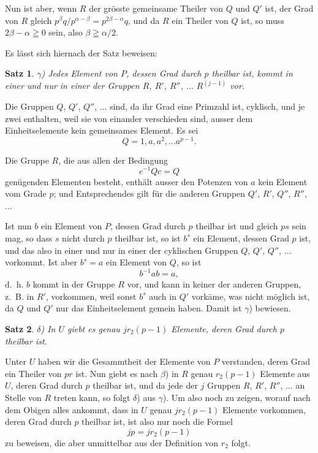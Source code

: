 \documentclass[12pt,a4paper]{article}
\theoremstyle{plain}
\newtheorem{satz}{Satz}[section]
\theoremstyle{definition}
\theoremstyle{remark}
\begin{document}
Nun ist aber, wenn $R$ der grösste gemeinsame Theiler von $Q$ und $Q'$ ist, der Grad von $R$ gleich $p^{\beta}q/p^{\alpha-\beta} = p^{2\beta-\alpha}q$, und da $R$ ein Theiler von $Q$ ist, so muss $2\beta - \alpha \geqq 0$ sein, also $\beta \geqq \alpha/2$.

Es lässt sich hiernach der Satz beweisen:

\begin{satz}
$\gamma$) Jedes Element von $P$, dessen Grad durch $p$ theilbar ist, kommt in einer und nur in einer der Gruppen $R$, $R'$, $R''$, $\ldots$ $R^{(j-1)}$ vor.
\end{satz}

Die Gruppen $Q$, $Q'$, $Q''$, $\ldots$ sind, da ihr Grad eine Primzahl ist, cyklisch, und je zwei enthalten, weil sie von einander verschieden sind, ausser dem Einheitselemente kein gemeinsames Element. Es sei
\[
Q = 1, a, a^{2}, \ldots a^{p-1}.
\]

Die Gruppe $R$, die aus allen der Bedingung
\[
c^{-1} Q c = Q
\]
genügenden Elementen besteht, enthält ausser den Potenzen von $a$ kein Element vom Grade $p$; und Entsprechendes gilt für die anderen Gruppen $Q'$, $R'$, $Q''$, $R''$, $\ldots$

Ist nun $b$ ein Element von $P$, dessen Grad durch $p$ theilbar ist und gleich $ps$ sein mag, so dass $s$ nicht durch $p$ theilbar ist, so ist $b^{s}$ ein Element, dessen Grad $p$ ist, und das also in einer und nur in einer der cyklischen Gruppen $Q$, $Q'$, $Q''$, $\ldots$ vorkommt. Ist aber $b^{s} = a$ ein Element von $Q$, so ist
\[
b^{-1} a b = a,
\]
d.~h. $b$ kommt in der Gruppe $R$ vor, und kann in keiner der anderen Gruppen, z.~B. in $R'$, vorkommen, weil sonst $b^{s}$ auch in $Q'$ vorkäme, was nicht möglich ist, da $Q$ und $Q'$ nur das Einheitselement gemein haben. Damit ist $\gamma$) bewiesen.

\begin{satz}
$\delta$) In $U$ giebt es genau $jr_{2}(p-1)$ Elemente, deren Grad durch $p$ theilbar ist.
\end{satz}

Unter $U$ haben wir die Gesammtheit der Elemente von $P$ verstanden, deren Grad ein Theiler von $pr$ ist. Nun giebt es nach $\beta$) in $R$ genau $r_{2}(p-1)$ Elemente aus $U$, deren Grad durch $p$ theilbar ist, und da jede der $j$ Gruppen $R$, $R'$, $R''$, $\ldots$ an Stelle von $R$ treten kann, so folgt $\delta$) aus $\gamma$). Um also noch zu zeigen, worauf nach dem Obigen alles ankommt, dass in $U$ genau $j r_{2}(p-1)$ Elemente vorkommen, deren Grad durch $p$ theilbar ist, ist also nur noch die Formel
\[
jp = jr_{2}(p-1)
\]
zu beweisen, die aber unmittelbar aus der Definition von $r_{2}$ folgt.
\end{document}
